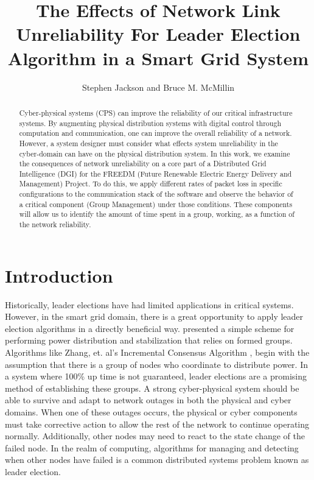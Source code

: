 \documentclass{llncs}
\begin{document}
\title{The Effects of Network Link Unreliability For Leader Election Algorithm in a Smart Grid System}
\author{Stephen Jackson and Bruce M. McMillin}

\maketitle

\begin{abstract}
Cyber-physical systems (CPS) can improve the reliability of our critical infrastructure systems. By augmenting physical distribution systems with digital control through computation and communication, one can improve the overall reliability of a network. However, a system designer must consider what effects system unreliability in the cyber-domain can have on the physical distribution system. In this work, we examine the consequences of network unreliability on a core part of a Distributed Grid Intelligence (DGI) for the FREEDM (Future Renewable Electric Energy Delivery and Management) Project. To do this, we apply different rates of packet loss in specific configurations to the communication stack of the software and observe the behavior of a critical component (Group Management) under those conditions. These components will allow us to identify the amount of time spent in a group, working, as a function of the network reliability.
\end{abstract}

\section{Introduction}

Historically, leader elections have had limited applications in critical systems. However, in the smart grid domain, there is a great opportunity to apply leader election algorithms in a directly beneficial way. \cite{LOADBALANCING} presented a simple scheme for performing power distribution and stabilization that relies on formed groups. Algorithms like Zhang, et. al's Incremental Consensus Algorithm \cite{INCREMENTALCONSENSUS}, begin with the assumption that there is a group of nodes who coordinate to distribute power. In a system where 100\% up time is not guaranteed, leader elections are a promising method of establishing these groups.
A strong cyber-physical system should be able to survive and adapt to network outages in both the physical and cyber domains. When one of these outages occurs, the physical or cyber components must take corrective action to allow the rest of the network to continue operating normally. Additionally, other nodes may need to react to the state change of the failed node. In the realm of computing, algorithms for managing and detecting when other nodes have failed is a common distributed systems problem known as leader election.
\end{document}
